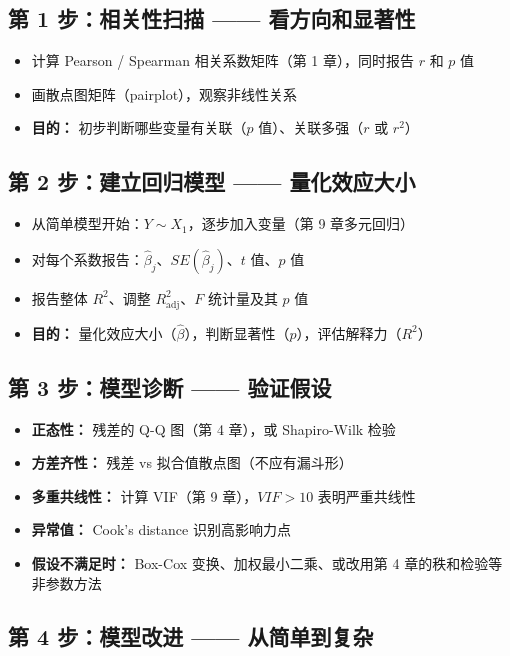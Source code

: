 \subsection{第 1 步：相关性扫描 —— 看方向和显著性}

\begin{itemize}
    \item 计算 Pearson / Spearman 相关系数矩阵（第 1 章），同时报告 $r$ 和 $p$ 值
    \item 画散点图矩阵（pairplot），观察非线性关系
    \item \textbf{目的：} 初步判断哪些变量有关联（$p$ 值）、关联多强（$r$ 或 $r^2$）
\end{itemize}

\subsection{第 2 步：建立回归模型 —— 量化效应大小}

\begin{itemize}
    \item 从简单模型开始：$Y \sim X_1$，逐步加入变量（第 9 章多元回归）
    \item 对每个系数报告：$\hat{\beta}_j$、$SE(\hat{\beta}_j)$、$t$ 值、$p$ 值
    \item 报告整体 $R^2$、调整 $R^2_{\text{adj}}$、$F$ 统计量及其 $p$ 值
    \item \textbf{目的：} 量化效应大小（$\hat{\beta}$），判断显著性（$p$），评估解释力（$R^2$）
\end{itemize}

\subsection{第 3 步：模型诊断 —— 验证假设}

\begin{itemize}
    \item \textbf{正态性：} 残差的 Q-Q 图（第 4 章），或 Shapiro-Wilk 检验
    \item \textbf{方差齐性：} 残差 vs 拟合值散点图（不应有漏斗形）
    \item \textbf{多重共线性：} 计算 VIF（第 9 章），$VIF > 10$ 表明严重共线性
    \item \textbf{异常值：} Cook's distance 识别高影响力点
    \item \textbf{假设不满足时：} Box-Cox 变换、加权最小二乘、或改用第 4 章的秩和检验等非参数方法
\end{itemize}

\subsection{第 4 步：模型改进 —— 从简单到复杂}

